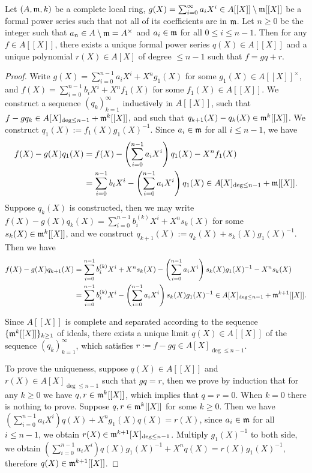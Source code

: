 \begin{prop}
\label{weierstrass-division}
\leanok
Let $(A,{\mathfrak{m}},k)$ be a complete local ring,
$g(X)=\sum_{i=0}^\infty a_iX^i\in A[[X]]\setminus{\mathfrak{m}}[[X]]$ be a formal power series
such that not all of its coefficients are in ${\mathfrak{m}}$.
Let $n\geq 0$ be the integer such that $a_n\in A\setminus{\mathfrak{m}}=A^\times$
and $a_i\in{\mathfrak{m}}$ for all $0\leq i\leq n-1$.
Then for any $f\in A[[X]]$,
there exists a unique formal power series
$q(X)\in A[[X]]$ and a unique polynomial $r(X)\in A[X]$ of degree $\leq n-1$
such that $f=gq+r$.
\end{prop}

\begin{proof}
\leanok
Write $g(X)=\sum_{i=0}^{n-1}a_iX^i+X^ng_1(X)$ for some $g_1(X)\in A[[X]]^\times$, and
$f(X)=\sum_{i=0}^{n-1}b_iX^i+X^nf_1(X)$ for some $f_1(X)\in A[[X]]$.
We construct a sequence $(q_k)_{k=1}^\infty$ inductively in $A[[X]]$,
such that $f-gq_k\in A[X]_{\deg\leq n-1}+{\mathfrak{m}}^k[[X]]$,
and such that $q_{k+1}(X)-q_k(X)\in{\mathfrak{m}}^k[[X]]$.
We construct $q_1(X):=f_1(X)g_1(X)^{-1}$.
Since $a_i\in{\mathfrak{m}}$ for all $i\leq n-1$, we have
\begin{align*}
f(X)-g(X)q_1(X)&=f(X)-\left(\sum_{i=0}^{n-1}a_iX^i\right)q_1(X)
-X^nf_1(X) \\
&=\sum_{i=0}^{n-1}b_iX^i-\left(\sum_{i=0}^{n-1}a_iX^i\right)q_1(X)
\in A[X]_{\deg\leq n-1}+{\mathfrak{m}}[[X]].
\end{align*}
Suppose $q_k(X)$ is constructed, then we may write
$f(X)-g(X)q_k(X)=\sum_{i=0}^{n-1}b_i^{(k)}X^i+X^ns_k(X)$
for some $s_k(X)\in{\mathfrak{m}}^k[[X]]$, and we construct
$q_{k+1}(X):=q_k(X)+s_k(X)g_1(X)^{-1}$. Then we have
\begin{align*}
f(X)-g(X)q_{k+1}(X)&=\sum_{i=0}^{n-1}b_i^{(k)}X^i+X^ns_k(X)
-\left(\sum_{i=0}^{n-1}a_iX^i\right)s_k(X)g_1(X)^{-1}
-X^ns_k(X) \\
&=\sum_{i=0}^{n-1}b_i^{(k)}X^i-\left(\sum_{i=0}^{n-1}a_iX^i\right)s_k(X)g_1(X)^{-1}
\in A[X]_{\deg\leq n-1}+{\mathfrak{m}}^{k+1}[[X]].
\end{align*}

Since $A[[X]]$ is complete and separated according to the sequence
$\{{\mathfrak{m}}^k[[X]]\}_{k\geq 1}$ of ideals, there exists a unique limit $q(X)\in A[[X]]$
of the sequence $(q_k)_{k=1}^\infty$, which satisfies $r:=f-gq\in A[X]_{\deg\leq n-1}$.

To prove the uniqueness, suppose $q(X)\in A[[X]]$ and $r(X)\in A[X]_{\deg\leq n-1}$
such that $gq=r$, then we prove by induction that for any $k\geq 0$
we have $q,r\in{\mathfrak{m}}^k[[X]]$, which implies that $q=r=0$.
When $k=0$ there is nothing to prove. Suppose $q,r\in{\mathfrak{m}}^k[[X]]$ for some $k\geq 0$.
Then we have $(\sum_{i=0}^{n-1}a_iX^i)q(X)+X^ng_1(X)q(X)=r(X)$,
since $a_i\in{\mathfrak{m}}$ for all $i\leq n-1$, we obtain $r(X)\in{\mathfrak{m}}^{k+1}[X]_{\deg\leq n-1}$.
Multiply $g_1(X)^{-1}$ to both side,
we obtain $(\sum_{i=0}^{n-1}a_iX^i)q(X)g_1(X)^{-1}+X^nq(X)=r(X)g_1(X)^{-1}$,
therefore $q(X)\in{\mathfrak{m}}^{k+1}[[X]]$.
\end{proof}

